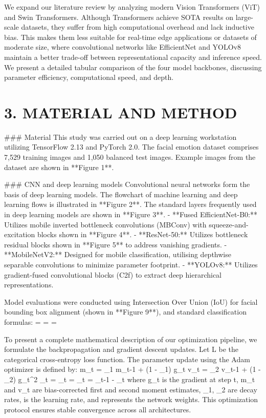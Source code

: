 \documentclass[journal,10pt]{IEEEtran}
\begin{document}
We expand our literature review by analyzing modern Vision Transformers (ViT) and Swin Transformers. Although Transformers achieve SOTA results on large-scale datasets, they suffer from high computational overhead and lack inductive bias. This makes them less suitable for real-time edge applications or datasets of moderate size, where convolutional networks like EfficientNet and YOLOv8 maintain a better trade-off between representational capacity and inference speed. We present a detailed tabular comparison of the four model backbones, discussing parameter efficiency, computational speed, and depth.

\section{3. MATERIAL AND METHOD}
### Material
This study was carried out on a deep learning workstation utilizing TensorFlow 2.13 and PyTorch 2.0. The facial emotion dataset comprises 7,529 training images and 1,050 balanced test images. Example images from the dataset are shown in **Figure 1**.

### CNN and deep learning models
Convolutional neural networks form the basis of deep learning models. The flowchart of machine learning and deep learning flows is illustrated in **Figure 2**. The standard layers frequently used in deep learning models are shown in **Figure 3**.
- **Fused EfficientNet-B0:** Utilizes mobile inverted bottleneck convolutions (MBConv) with squeeze-and-excitation blocks shown in **Figure 4**.
- **ResNet-50:** Utilizes bottleneck residual blocks shown in **Figure 5** to address vanishing gradients.
- **MobileNetV2:** Designed for mobile classification, utilising depthwise separable convolutions to minimize parameter footprint.
- **YOLOv8:** Utilizes gradient-fused convolutional blocks (C2f) to extract deep hierarchical representations.

Model evaluations were conducted using Intersection Over Union (IoU) for facial bounding box alignment (shown in **Figure 9**), and standard classification formulas:
 = 
 = 
 = 

To present a complete mathematical description of our optimization pipeline, we formulate the backpropagation and gradient descent updates. Let L be the categorical cross-entropy loss function. The parameter update using the Adam optimizer is defined by:
m\_t = \beta\_1 m\_{t-1} + (1 - \beta\_1) g\_t
v\_t = \beta\_2 v\_{t-1} + (1 - \beta\_2) g\_t^2
\_t = 
\_t = 
\theta\_t = \theta\_{t-1} -  \_t
where g\_t is the gradient at step t, m\_t and v\_t are bias-corrected first and second moment estimates, \beta\_1, \beta\_2 are decay rates, \eta is the learning rate, and \theta represents the network weights. This optimization protocol ensures stable convergence across all architectures.
\end{document}
